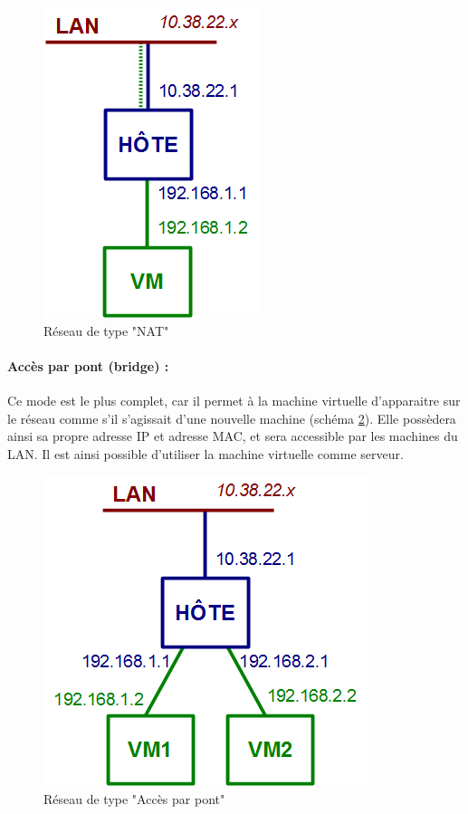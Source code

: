 \begin{figure}[H]
	\center
	\includegraphics[scale=0.5]{images/types_reseau/NAT.png}
	\caption{Réseau de type "NAT"}
	\label{Schéma NAT}
\end{figure}


\paragraph{Accès par pont (bridge) :}

Ce mode est le plus complet, car il permet à la machine virtuelle d'apparaitre sur le réseau comme s'il s'agissait d'une nouvelle machine (schéma \ref{Schéma Accès par pont}).
Elle possèdera ainsi sa propre adresse IP et adresse MAC, et sera accessible par les machines du LAN.
Il est ainsi possible d'utiliser la machine virtuelle comme serveur.

\begin{figure}[H]
	\center
	\includegraphics[scale=0.5]{images/types_reseau/Acces_prive_hote.png}
	\caption{Réseau de type "Accès par pont"}
	\label{Schéma Accès par pont}
\end{figure}
~~\\



